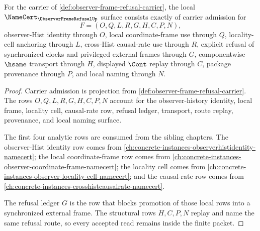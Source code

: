 \begin{theorem}
\label{thm:observer-frame-refusal-namecert-obligations}
For the carrier of \autoref{def:observer-frame-refusal-carrier}, the local $\NameCert_{\ObserverFrameRefusalUp}$ surface consists exactly of carrier admission for
$$
F=(O,Q,L,R,G,H,C,P,N),
$$
observer-Hist identity through $O$, local coordinate-frame use through $Q$, locality-cell anchoring through $L$, cross-Hist causal-rate use through $R$, explicit refusal of synchronized clocks and privileged external frames through $G$, componentwise $\hsame$ transport through $H$, displayed $\Cont$ replay through $C$, package provenance through $P$, and local naming through $N$.
\end{theorem}
\begin{proof}
Carrier admission is projection from \autoref{def:observer-frame-refusal-carrier}. The rows $O,Q,L,R,G,H,C,P,N$ account for the observer-history identity, local frame, locality cell, causal-rate row, refusal ledger, transport, route replay, provenance, and local naming surface.

The first four analytic rows are consumed from the sibling chapters. The observer-Hist identity row comes from \autoref{ch:concrete-instances-observerhistidentity-namecert}; the local coordinate-frame row comes from \autoref{ch:concrete-instances-observer-coordinate-frame-namecert}; the locality cell comes from \autoref{ch:concrete-instances-observer-locality-cell-namecert}; and the causal-rate row comes from \autoref{ch:concrete-instances-crosshistcausalrate-namecert}.

The refusal ledger $G$ is the row that blocks promotion of those local rows into a synchronized external frame. The structural rows $H,C,P,N$ replay and name the same refusal route, so every accepted read remains inside the finite packet.
\end{proof}

